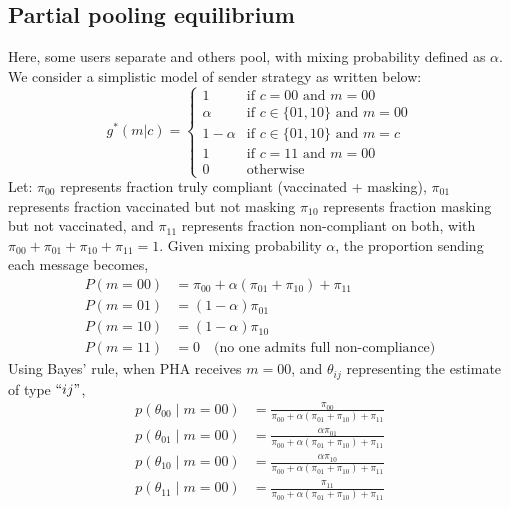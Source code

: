 \documentclass[sigconf,review]{acmart}
\begin{document}
\subsection{Partial pooling equilibrium}
\label{supp:equilibrium-pooling}
Here, some users separate and others pool, with mixing probability defined as $\alpha$. We consider a simplistic model of sender strategy as written below:
\begin{equation}
    g^*(m|c) =
\begin{cases}
1 & \text{if } c = 00 \text{ and } m = 00 \\
\alpha & \text{if } c \in \{01,10\} \text{ and } m = 00 \\
1-\alpha & \text{if } c \in \{01,10\} \text{ and } m = c \\
1 & \text{if } c = 11 \text{ and } m = 00 \\
0 & \text{otherwise}
\end{cases}
\end{equation}
Let:
$\pi_{00}$ represents fraction truly compliant (vaccinated + masking),
 $\pi_{01}$ represents fraction vaccinated but not masking
$\pi_{10}$  represents fraction masking but not vaccinated, and 
 $\pi_{11}$  represents  fraction non-compliant on both, with
$
\pi_{00} + \pi_{01} + \pi_{10} + \pi_{11} = 1.
$ Given mixing probability $\alpha$, the proportion sending each message becomes,
\begin{equation}
\begin{aligned}
P(m = 00) &= \pi_{00} + \alpha(\pi_{01} + \pi_{10}) + \pi_{11}\\
P(m = 01) &= (1 - \alpha)\pi_{01}\\
P(m = 10) &= (1 - \alpha)\pi_{10}\\
P(m = 11) &= 0 \quad \text{(no one admits full non-compliance)}    
\end{aligned}
\end{equation}
Using Bayes' rule, when PHA receives $m = 00$, and $\theta_{ij}$ representing the estimate of type $``ij"$,
\begin{equation}\begin{aligned}
p(\theta_{00} \mid m = 00) &= \frac{\pi_{00}}{\pi_{00} + \alpha(\pi_{01} + \pi_{10}) + \pi_{11}}\\
p(\theta_{01} \mid m = 00) &= \frac{\alpha \pi_{01}}{\pi_{00} + \alpha(\pi_{01} + \pi_{10}) + \pi_{11}}\\
p(\theta_{10} \mid m = 00) &= \frac{\alpha \pi_{10}}{\pi_{00} + \alpha(\pi_{01} + \pi_{10}) + \pi_{11}}\\
p(\theta_{11} \mid m = 00) &= \frac{\pi_{11}}{\pi_{00} + \alpha(\pi_{01} + \pi_{10}) + \pi_{11}}\end{aligned}
\end{equation}
\end{document}
